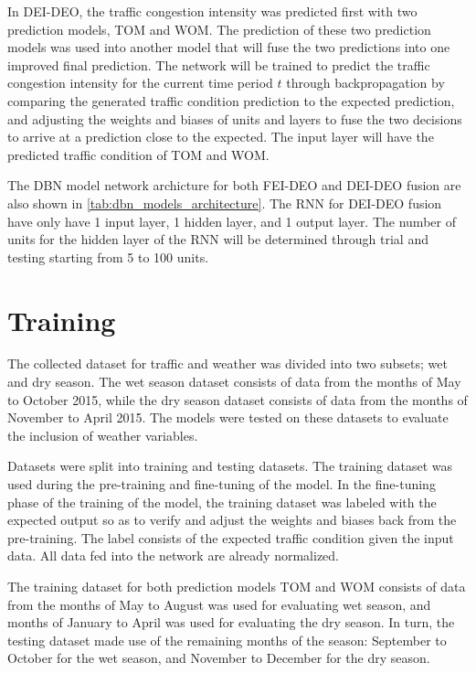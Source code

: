 In DEI-DEO, the traffic congestion intensity was predicted first with two prediction models, TOM and WOM. The prediction of these two prediction models was used into another model that will fuse the two predictions into one improved final prediction. The network will be trained to predict the traffic congestion intensity for the current time period $t$ through backpropagation by comparing the generated traffic condition prediction to the expected prediction, and adjusting the weights and biases of units and layers to fuse the two decisions to arrive at a prediction close to the expected. The input layer will have the predicted traffic condition of TOM and WOM.

The DBN model network archicture for both FEI-DEO and DEI-DEO fusion are also shown in \ref{tab:dbn_models_architecture}. The RNN for DEI-DEO fusion have only have 1 input layer, 1 hidden layer, and 1 output layer. The number of units for the hidden layer of the RNN will be determined through trial and testing starting from 5 to 100 units.

\section{Training}
The collected dataset for traffic and weather was divided into two subsets; wet and dry season. The wet season dataset consists of data from the months of May to October 2015, while the dry season dataset consists of data from the months of November to April 2015. The models were tested on these datasets to evaluate the inclusion of weather variables.

Datasets were split into training and testing datasets. The training dataset was used during the pre-training and fine-tuning of the model. In the fine-tuning phase of the training of the model, the training dataset was labeled with the expected output so as to verify and adjust the weights and biases back from the pre-training. The label consists of the expected traffic condition given the input data. All data fed into the network are already normalized.

The training dataset for both prediction models TOM and WOM consists of data from the months of May to August was used for evaluating wet season, and months of January to April was used for evaluating the dry season. In turn, the testing dataset made use of the remaining months of the season: September to October for the wet season, and November to December for the dry season.


